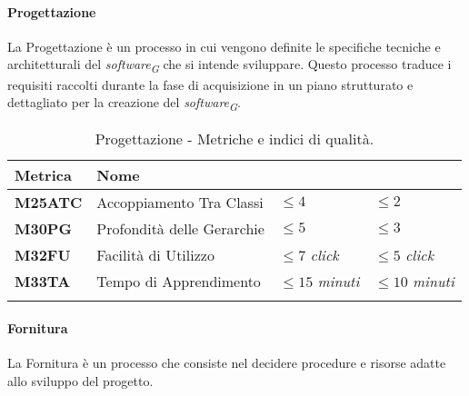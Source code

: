 \paragraph{Progettazione}
La Progettazione è un processo in cui vengono definite le specifiche tecniche e architetturali del \textit{software}\textsubscript{\textit{G}} che si intende sviluppare. Questo processo traduce i requisiti raccolti durante la fase di acquisizione in un piano strutturato e dettagliato per la creazione del \textit{software}\textsubscript{\textit{G}}.

\hspace{1pt}
    \begin{longtable}{|C{1.5cm}|L{3cm}|L{2.5cm}|L{2.5cm}|}
        \hline
        \textbf{Metrica} & \textbf{Nome} & \textbf{} & \textbf{} \\
        \hline
        \textbf{M25ATC} & Accoppiamento Tra Classi & $\leq 4$  & $\leq 2$ \\
        \hline
        \textbf{M30PG} & Profondità delle Gerarchie & $\leq 5$  & $\leq 3$ \\
        \hline
        \textbf{M32FU} & Facilità di Utilizzo & $\leq 7$ \textit{click}  & $\leq 5$ \textit{click} \\
        \hline
        \textbf{M33TA} & Tempo di Apprendimento & $\leq 15$ \textit{minuti}  & $\leq 10$ \textit{minuti} \\
        \hline
    \caption{Progettazione - Metriche e indici di qualità.}
    \label{tab:progettazione_progetto}
\end{longtable}

\paragraph{Fornitura}
La Fornitura è un processo che consiste nel decidere procedure e risorse
adatte allo sviluppo del progetto.


